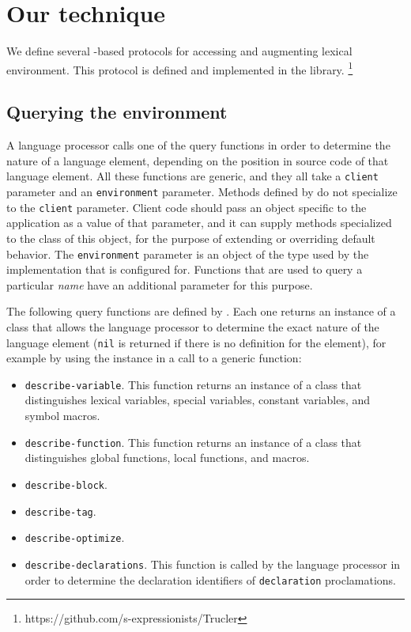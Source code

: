 \section{Our technique}
\label{sec-our-technique}

We define several \clos{}-based protocols for accessing and augmenting
lexical environment.  This protocol is defined and implemented in the
\trucler{} library.%
\footnote{https://github.com/s-expressionists/Trucler}

\subsection{Querying the environment}
\label{querying-the-environment}

A language processor calls one of the query functions in order to
determine the nature of a language element, depending on the position
in source code of that language element.  All these functions are
generic, and they all take a \texttt{client} parameter and an
\texttt{environment} parameter.  Methods defined by \trucler{} do not
specialize to the \texttt{client} parameter.  Client code should pass
an object specific to the application as a value of that parameter,
and it can supply methods specialized to the class of this object, for
the purpose of extending or overriding default behavior.  The
\texttt{environment} parameter is an object of the type used by the
implementation that \trucler{} is configured for.  Functions that are
used to query a particular \emph{name} have an additional parameter
for this purpose.

The following query functions are defined by \trucler{}.  Each one
returns an instance of a class that allows the language processor to
determine the exact nature of the language element (\texttt{nil} is
returned if there is no definition for the element), for example by
using the instance in a call to a generic function:

\begin{itemize}
\item \texttt{describe-variable}.  This function returns an instance
  of a class that distinguishes lexical variables, special variables,
  constant variables, and symbol macros.
\item \texttt{describe-function}.  This function returns an instance
  of a class that distinguishes global functions, local functions, and
  macros.
\item \texttt{describe-block}.
\item \texttt{describe-tag}.
\item \texttt{describe-optimize}.
\item \texttt{describe-declarations}.  This function is called by the
  language processor in order to determine the declaration identifiers
  of \texttt{declaration} proclamations.
\end{itemize}

